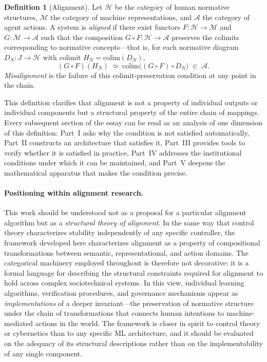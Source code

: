 \documentclass[12pt]{article}
\theoremstyle{definition}
\newtheorem{definition}[theorem]{Definition}
\begin{document}
\begin{definition}[Alignment]
\label{def:alignment}
Let $\mathcal{H}$ be the category of human normative structures, $\mathcal{M}$
the category of machine representations, and $\mathcal{A}$ the category of
agent actions. A system is \emph{aligned} if there exist functors
$F : \mathcal{H} \to \mathcal{M}$ and $G : \mathcal{M} \to \mathcal{A}$ such
that the composition $G \circ F : \mathcal{H} \to \mathcal{A}$ preserves the
colimits corresponding to normative concepts---that is, for each normative
diagram $D_N : J \to \mathcal{H}$ with colimit $H_N = \mathrm{colim}(D_N)$,
\begin{equation}
  (G \circ F)(H_N) \;\simeq\; \mathrm{colim}\bigl((G\circ F) \circ D_N\bigr)
  \;\in\; \mathcal{A}.
\end{equation}
\emph{Misalignment} is the failure of this colimit-preservation condition at
any point in the chain.
\end{definition}

This definition clarifies that alignment is not a property of individual outputs
or individual components but a structural property of the entire chain of
mappings. Every subsequent section of the essay can be read as an analysis of
one dimension of this definition: Part~I asks why the condition is not satisfied
automatically, Part~II constructs an architecture that satisfies it, Part~III
provides tools to verify whether it is satisfied in practice, Part~IV addresses
the institutional conditions under which it can be maintained, and Part~V
deepens the mathematical apparatus that makes the condition precise.

\paragraph{Positioning within alignment research.}
This work should be understood not as a proposal for a particular alignment
algorithm but as a \emph{structural theory of alignment}. In the same way that
control theory characterizes stability independently of any specific controller,
the framework developed here characterizes alignment as a property of
compositional transformations between semantic, representational, and action
domains. The categorical machinery employed throughout is therefore not
decorative: it is a formal language for describing the structural constraints
required for alignment to hold across complex sociotechnical systems. In this
view, individual learning algorithms, verification procedures, and governance
mechanisms appear as \emph{implementations} of a deeper invariant---the
preservation of normative structure under the chain of transformations that
connects human intentions to machine-mediated actions in the world. The
framework is closer in spirit to control theory or cybernetics than to any
specific ML architecture, and it should be evaluated on the adequacy of its
structural descriptions rather than on the implementability of any single
component.
\end{document}
